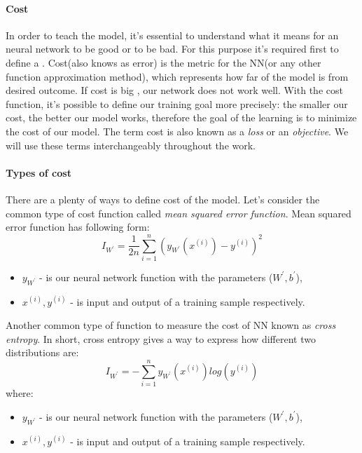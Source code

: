 \paragraph{Cost} In order to teach the model, it's essential to understand
what it means for an neural network to be good or to be bad. For this purpose
it's required first to define a . Cost(also knows as error) is the metric
for the NN(or any other function approximation method), which represents how far of
the model is from desired outcome. If cost is big , our network does not work well.
With the cost function, it's possible
to define our training goal more precisely: the smaller our cost, the better our
model works, therefore the goal of the learning is to minimize the cost of our model.
The term cost is also known as a \emph{loss} or an \emph{objective}. We will use these terms
interchangeably throughout the work.

\paragraph{Types of cost} There are a plenty of ways to define cost of the model.
Let's consider the common type of cost function called \emph{mean squared error function}.
Mean squared error function has following form:
\begin{equation} \label{eq:mse}
	I_{W^\prime} = \frac{1}{2n} \sum_{i=1}^n (y_{W^\prime}(x^{(i)}) - y^{(i)})^2
\end{equation}
\begin{itemize}
	\item $y_{W^\prime}$ - is our neural network function with the parameters ($W^\prime, b^\prime$),
	\item $x^{(i)}, y^{(i)}$ - is input and output of a training sample respectively.
\end{itemize}

Another common type of function to measure the cost of NN known as \emph{cross entropy}.
In short, cross entropy gives a way to express how different two distributions are:
\begin{equation} \label{eq:cross_entr}
	I_{W^\prime} = - \sum_{i=1}^n  y_{W^\prime}(x^{(i)}) log(y^{(i)})
\end{equation}
where:
\begin{itemize}
	\item $y_{W^\prime}$ - is our neural network function with the parameters ($W^\prime, b^\prime$),
	\item $x^{(i)}, y^{(i)}$ - is input and output of a training sample respectively.
\end{itemize}
\cite{Nielsen2015}

